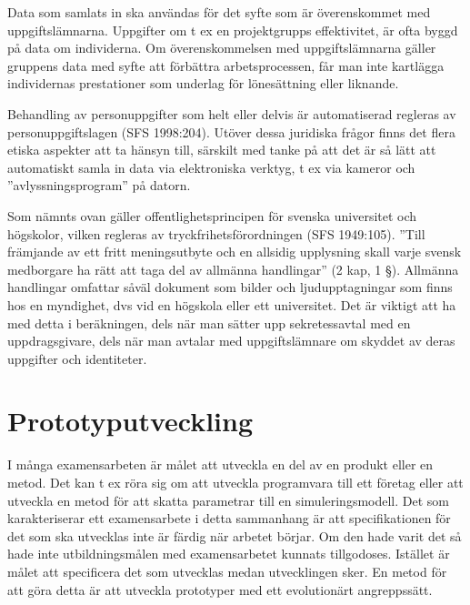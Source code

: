 Data som samlats in ska användas för det syfte som är överenskommet med
uppgiftslämnarna. Uppgifter om t ex en projektgrupps effektivitet, är
ofta byggd på data om individerna. Om överenskommelsen med
uppgiftslämnarna gäller gruppens data med syfte att förbättra
arbetsprocessen, får man inte kartlägga individernas prestationer som
underlag för lönesättning eller liknande.

Behandling av personuppgifter som helt eller delvis är automatiserad
regleras av personuppgiftslagen (SFS 1998:204). Utöver dessa juridiska
frågor finns det flera etiska aspekter att ta hänsyn till, särskilt med
tanke på att det är så lätt att automatiskt samla in data via
elektroniska verktyg, t ex via kameror och ''avlyssningsprogram'' på
datorn.

Som nämnts ovan gäller offentlighetsprincipen för svenska universitet
och högskolor, vilken regleras av tryckfrihetsförordningen (SFS
1949:105). ''Till främjande av ett fritt meningsutbyte och en allsidig
upplysning skall varje svensk medborgare ha rätt att taga del av
allmänna handlingar'' (2 kap, 1 §). Allmänna handlingar omfattar såväl
dokument som bilder och ljudupptagningar som finns hos en myndighet, dvs
vid en högskola eller ett universitet. Det är viktigt att ha med detta i
beräkningen, dels när man sätter upp sekretessavtal med en
uppdragsgivare, dels när man avtalar med uppgiftslämnare om skyddet av
deras uppgifter och identiteter.

\section{Prototyputveckling}\label{prototyputveckling}

I många examensarbeten är målet att utveckla en del av en produkt eller
en metod. Det kan t ex röra sig om att utveckla programvara till ett
företag eller att utveckla en metod för att skatta parametrar till en
simuleringsmodell. Det som karakteriserar ett examensarbete i detta
sammanhang är att specifikationen för det som ska utvecklas inte är
färdig när arbetet börjar. Om den hade varit det så hade inte
utbildningsmålen med examensarbetet kunnats tillgodoses. Istället är
målet att specificera det som utvecklas medan utvecklingen sker. En
metod för att göra detta är att utveckla prototyper med ett evolutionärt
angreppssätt.

